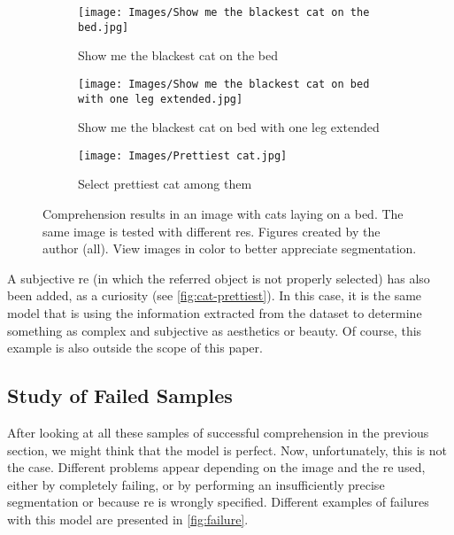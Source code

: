 \begin{figure}[p]
  \bigskip
  \begin{subfigure}[t]{.3\textwidth}
    \centering
    \caption{Show me the blackest cat on the bed}
    \texttt{[image: Images/Show me the blackest cat on the bed.jpg]}
  \end{subfigure}\hfill
  \begin{subfigure}[t]{.3\textwidth}
    \centering
    \caption{Show me the blackest cat on bed with one leg extended}
    \texttt{[image: Images/Show me the blackest cat on bed with one leg extended.jpg]}
  \end{subfigure}\hfill
  \begin{subfigure}[t]{.3\textwidth}
    \centering
    \caption{Select prettiest cat among them}\label{fig:cat-prettiest}
    \texttt{[image: Images/Prettiest cat.jpg]}
  \end{subfigure}
  \caption[Comprehension results in an image with cats]{Comprehension results
    in an image with cats laying on a bed. The same image is tested with
    different \glspl{re}. Figures created by the author (all). View images in
    color to better appreciate segmentation.}%
  \label{fig:cats}
\end{figure}

A subjective \gls{re} (in which the referred object is not properly selected)
has also been added, as a curiosity (see \vref{fig:cat-prettiest}). In this
case, it is the same model that is using the information extracted from the
dataset to determine something as complex and subjective as aesthetics or
beauty. Of course, this example is also outside the scope of this paper.


\subsection{Study of Failed Samples}\label{sec:failed}

After looking at all these samples of successful comprehension in the previous
section, we might think that the model is perfect. Now, unfortunately, this is
not the case. Different problems appear depending on the image and the \gls{re}
used, either by completely failing, or by performing an insufficiently precise
segmentation or because \gls{re} is wrongly specified. Different examples of
failures with this model are presented in \vref{fig:failure}.

